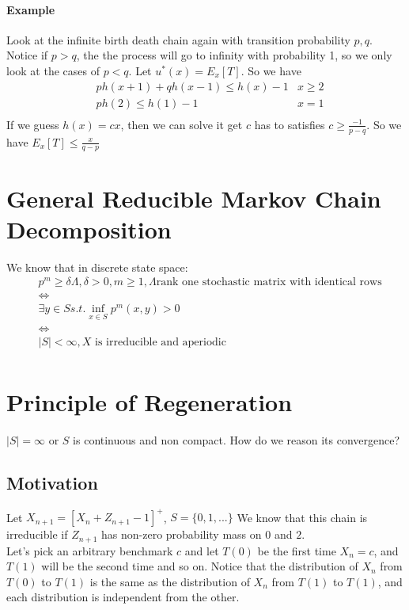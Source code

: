 \paragraph{Example}
Look at the infinite birth death chain again with transition probability $p,q$. Notice if $p > q$, the the process will go to infinity with probability 1, so we only look at the cases of $p < q$. Let $u^*(x) = E_x[T]$. So we have 
    \begin{align*}
        & ph(x+1) + qh(x-1) \leq h(x) - 1 & x \geq 2 \\
        & p h(2) \leq h(1) - 1 & x = 1 \\
    \end{align*}
If we guess $h(x) = cx$, then we can solve it get $c$ has to satisfies $c \geq \frac{-1}{p-q}$. So we have $E_x[T] \leq \frac{x}{q-p}$


\section{General Reducible Markov Chain Decomposition} 
We know that in discrete state space: 
    \begin{align*}
        & p^m \geq \delta \Lambda, \delta > 0, m \geq 1, \Lambda \text{rank one stochastic matrix with identical rows} \\
        & \Longleftrightarrow \\
        & \exists y \in S s.t. \inf_{x\in S} p^m(x,y) > 0\\
        & \Longleftrightarrow \\
        & |S| < \infty, \text{$X$ is irreducible and aperiodic} \\
    \end{align*}

\section{Principle of Regeneration}
$|S|=\infty$ or $S$ is continuous and non compact. How do we reason its convergence? 

\subsection{Motivation}
Let $X_{n+1} = [X_n + Z_{n+1} - 1]^+$, $S = \{ 0, 1, ...\}$ We know that this chain is irreducible if $Z_{n+1}$ has non-zero probability mass on $0$ and $2$.\\

Let's pick an arbitrary benchmark $c$ and let $T(0)$ be the first time $X_n = c$, and $T(1)$ will be the second time and so on. Notice that the distribution of $X_n$ from $T(0)$ to $T(1)$ is the same as the distribution of $X_n$ from $T(1)$ to $T(1)$, and each distribution is independent from the other. \\

